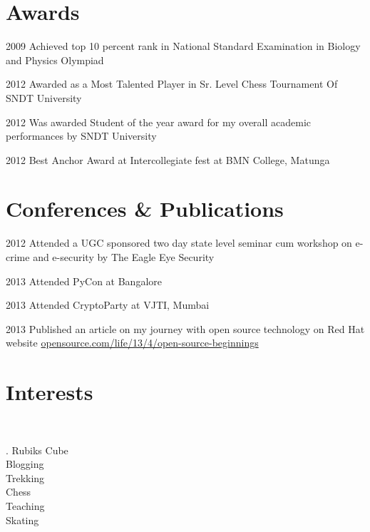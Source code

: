 \documentclass[]{friggeri-cv}
\begin{document}
\section{Awards}
\begin{entrylist}
  \entry
    {2009}
    {Achieved top 10 percent rank in National Standard Examination in Biology and
Physics Olympiad}
    {}
    {\emph{}}
    \end{entrylist}
    \begin{entrylist}
     \entry
      {2012}
    {Awarded as a Most Talented Player in Sr. Level Chess Tournament Of SNDT
University}
    {}
    {\emph{}}
\end{entrylist}
 \begin{entrylist}
     \entry
      {2012}
    {Was awarded Student of the year award for my overall academic performances by
SNDT University}
    {}
    {\emph{}}
\end{entrylist}
\begin{entrylist}
     \entry
      {2012}
    {Best Anchor Award at Intercollegiate fest at BMN College, Matunga}
    {}
    {\emph{}}
\end{entrylist}
\newpage
\section{Conferences \& Publications}
\begin{entrylist}
     \entry
      {2012}
    {Attended a UGC sponsored two day state level seminar cum workshop on e-crime
and e-security by The Eagle Eye Security}
    {}
    {\emph{}}
\end{entrylist}
\begin{entrylist}
     \entry
      {2013}
    {Attended PyCon at Bangalore}
    {}
    {\emph{}}
\end{entrylist}
\begin{entrylist}
     \entry
      {2013}
    {Attended CryptoParty at VJTI, Mumbai}
    {}
    {\emph{}}
\end{entrylist}
\begin{entrylist}
     \entry
      {2013}
    {Published an article on my journey with open source technology on Red Hat website}
    {}
    {\href{http://opensource.com/life/13/4/open-source-beginnings}{opensource.com/life/13/4/open-source-beginnings}}
\end{entrylist}

\section{Interests}
\\
\begin{entrylist}
  \entry
    {.}
    {Rubiks Cube}
    {}
    {\\}
  \entry
    {}
    {Blogging}
    {}
    {\\}
    \entry
    {}
    {Trekking}
    {}
    {\\}
    \entry
    {}
    {Chess}
    {}
    {\\}
    \entry
    {}
    {Teaching}
    {}
    {\\}
    \entry
    {}
    {Skating}
    {}
    {\\}
   \end{entrylist}
\end{document}
